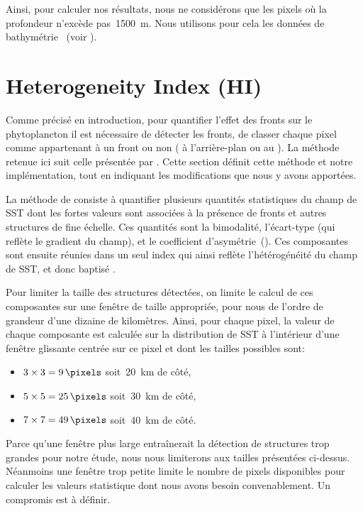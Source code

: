 Ainsi, pour calculer nos résultats, nous ne considérons que les pixels où la profondeur n'excède pas~\qty{1500}{\m}.
Nous utilisons pour cela les données de bathymétrie ~(voir ).

\section{Heterogeneity Index (HI)}
\label{sec:HI}

Comme précisé en introduction, pour quantifier l'effet des fronts sur le phytoplancton il est nécessaire de détecter les fronts,  de classer chaque pixel comme appartenant à un front ou non ( à l'arrière-plan ou au ).
La méthode retenue ici suit celle présentée par \textcite{liu_2016} .
Cette section définit cette méthode et notre implémentation, tout en indiquant les modifications que nous y avons apportées.

La méthode de \textcite{liu_2016} consiste à quantifier plusieurs quantités statistiques du champ de SST dont les fortes valeurs sont associées à la présence de fronts et autres structures de fine échelle.
Ces quantités sont la bimodalité, l'écart-type (qui reflète le gradient du champ), et le coefficient d'asymétrie~().
Ces composantes sont ensuite réunies dans un seul index qui ainsi reflète l'hétérogénéité du champ de SST, et donc baptisé .

Pour limiter la taille des structures détectées, on limite le calcul de ces composantes sur une fenêtre de taille appropriée,  pour nous de l'ordre de grandeur d'une dizaine de kilomètres.
Ainsi, pour chaque pixel, la valeur de chaque composante est calculée sur la distribution de SST à l'intérieur d'une fenêtre glissante centrée sur ce pixel et dont les tailles possibles sont:
\begin{itemize}
  \item \(3 \times 3 =\qty{9}{\pixels}\) soit~\tapprox\qty{20}{\km} de côté,
  \item \(5 \times 5 =\qty{25}{\pixels}\) soit~\tapprox\qty{30}{\km} de côté,
  \item \(7 \times 7 =\qty{49}{\pixels}\) soit~\tapprox\qty{40}{\km} de côté.
\end{itemize}
Parce qu'une fenêtre plus large entraînerait la détection de structures trop grandes pour notre étude, nous nous limiterons aux tailles présentées ci-dessus.
Néanmoins une fenêtre trop petite limite le nombre de pixels disponibles pour calculer les valeurs statistique dont nous avons besoin convenablement.
Un compromis est à définir.

